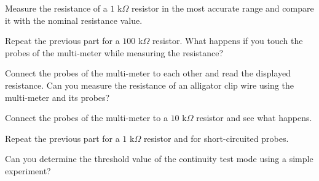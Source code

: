 \documentclass[11pt]{article}
\begin{document}

\begin{question}


\begin{subquestion}{Measure the resistance of a $1$ k$\Omega$ resistor in the most accurate range and compare it with the nominal resistance value.}
\answer{}
\end{subquestion}

\begin{subquestion}{Repeat the previous part for a $100$ k$\Omega$ resistor. What happens if you touch the probes of the multi-meter while measuring the resistance?}
\answer{}
\end{subquestion}

\begin{subquestion}{Connect the probes of the multi-meter to each other and read the displayed resistance. Can you measure the resistance of an alligator clip wire using the multi-meter and its probes? }
\answer{}
\end{subquestion}

\end{question}



\begin{question}


\begin{subquestion}{Connect the probes of the multi-meter to a $10$ k$\Omega$ resistor and see what happens.}
\answer{}
\end{subquestion}


\begin{subquestion}{Repeat the previous part for a $1$ k$\Omega$ resistor and for short-circuited probes.}
\answer{}
\end{subquestion}

\begin{subquestion}{Can you determine the threshold value of the continuity test mode using a simple experiment?}
\answer{}
\end{subquestion}

\end{question}
\end{document}
